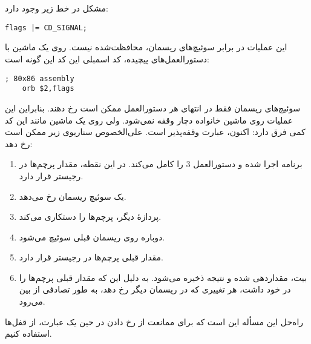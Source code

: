 \section{}
\paragraph{}\label{answer:52}
مشکل در خط زیر وجود دارد:
\begin{LTR}
    \begin{lstlisting}[style=C++Style]
        flags |= CD_SIGNAL;
    \end{lstlisting}
\end{LTR}

این عملیات در برابر سوئیچ‌های ریسمان، محافظت‌شده نیست. روی یک ماشین با دستورالعمل‌های پیچیده، کد اسمبلی این کد این گونه است:
\begin{LTR}
    \begin{lstlisting}[style=C++Style]
    ; 80x86 assembly
    orb $2,flags
    \end{lstlisting}
\end{LTR}

سوئیچ‌های ریسمان فقط در انتهای هر دستورالعمل ممکن است رخ دهند. بنابراین این عملیات روی ماشین خانواده  دچار وقفه نمی‌شود. ولی روی یک ماشین  مانند  این کد کمی فرق دارد:
\LTR\noindent
{}
\RTL
اکنون، عبارت  وقفه‌پذیر است. علی‌الخصوص سناریوی زیر ممکن است رخ دهد:
\begin{enumerate}
\item برنامه اجرا شده و دستورالعمل 3 را کامل می‌کند. در این نقطه، مقدار پرچم‌ها در رجیستر  قرار دارد.
\item یک سوئیچ ریسمان رخ می‌دهد.
\item پردازهٔ دیگر، پرچم‌ها را دستکاری می‌کند.
\item دوباره روی ریسمان قبلی سوئیچ می‌شود.
\item مقدار قبلی پرچم‌ها در رجیستر  قرار دارد.
\item بیت، مقداردهی شده و نتیجه ذخیره می‌شود. به دلیل این که مقدار قبلی پرچم‌ها را در خود داشت، هر تغییری که در ریسمان دیگر رخ دهد، به طور تصادفی از بین می‌رود.
\end{enumerate}

راه‌حل این مسأله این است که برای ممانعت از رخ دادن  در حین یک عبارت، از قفل‌ها استفاده کنیم.
